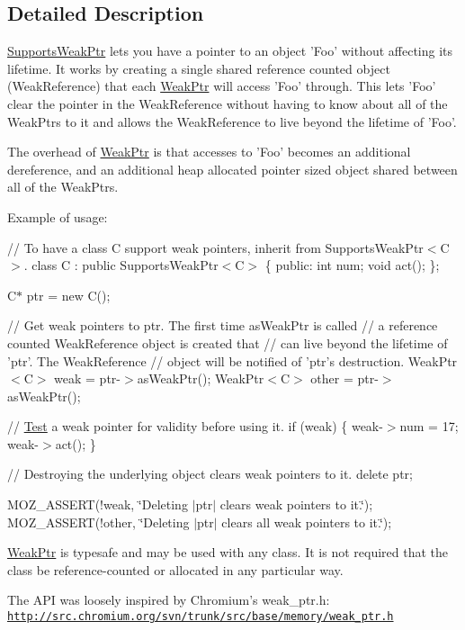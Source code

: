 \subsection{Detailed Description}
\hyperlink{classmozilla_1_1_supports_weak_ptr}{Supports\-Weak\-Ptr} lets you have a pointer to an object 'Foo' without affecting its lifetime. It works by creating a single shared reference counted object (Weak\-Reference) that each \hyperlink{classmozilla_1_1_weak_ptr}{Weak\-Ptr} will access 'Foo' through. This lets 'Foo' clear the pointer in the Weak\-Reference without having to know about all of the Weak\-Ptrs to it and allows the Weak\-Reference to live beyond the lifetime of 'Foo'.

The overhead of \hyperlink{classmozilla_1_1_weak_ptr}{Weak\-Ptr} is that accesses to 'Foo' becomes an additional dereference, and an additional heap allocated pointer sized object shared between all of the Weak\-Ptrs.

Example of usage\-:

// To have a class C support weak pointers, inherit from Supports\-Weak\-Ptr$<$\-C$>$. class C \-: public Supports\-Weak\-Ptr$<$\-C$>$ \{ public\-: int num; void act(); \};

C$\ast$ ptr = new C();

// Get weak pointers to ptr. The first time as\-Weak\-Ptr is called // a reference counted Weak\-Reference object is created that // can live beyond the lifetime of 'ptr'. The Weak\-Reference // object will be notified of 'ptr's destruction. Weak\-Ptr$<$\-C$>$ weak = ptr-\/$>$as\-Weak\-Ptr(); Weak\-Ptr$<$\-C$>$ other = ptr-\/$>$as\-Weak\-Ptr();

// \hyperlink{class_test}{Test} a weak pointer for validity before using it. if (weak) \{ weak-\/$>$num = 17; weak-\/$>$act(); \}

// Destroying the underlying object clears weak pointers to it. delete ptr;

M\-O\-Z\-\_\-\-A\-S\-S\-E\-R\-T(!weak, \char`\"{}\-Deleting $|$ptr$|$ clears weak pointers to it.\char`\"{}); M\-O\-Z\-\_\-\-A\-S\-S\-E\-R\-T(!other, \char`\"{}\-Deleting $|$ptr$|$ clears all weak pointers to it.\char`\"{});

\hyperlink{classmozilla_1_1_weak_ptr}{Weak\-Ptr} is typesafe and may be used with any class. It is not required that the class be reference-\/counted or allocated in any particular way.

The A\-P\-I was loosely inspired by Chromium's weak\-\_\-ptr.\-h\-: \href{http://src.chromium.org/svn/trunk/src/base/memory/weak_ptr.h}{\tt http\-://src.\-chromium.\-org/svn/trunk/src/base/memory/weak\-\_\-ptr.\-h} 

